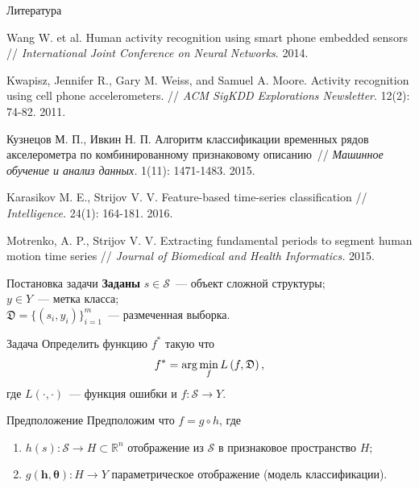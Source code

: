 \documentclass{beamer}
\begin{document}
\begin{frame}{Литература}
	\begin{enumerate}
		{ \footnotesize
		\item Wang W. et al. Human activity recognition using smart phone embedded sensors // \emph{International Joint Conference on Neural Networks}. 2014.
		\vfill
		\item Kwapisz, Jennifer R., Gary M. Weiss, and Samuel A. Moore. Activity recognition using cell phone accelerometers. // \emph{ACM SigKDD Explorations Newsletter}. 12(2): 74-82. 2011.
		\vfill
		\item Кузнецов М. П., Ивкин Н. П. Алгоритм классификации временных рядов акселерометра по комбинированному признаковому описанию~// \emph{Машинное обучение и анализ данных.} 1(11): 1471-1483. 2015.
		\vfill
		\item Karasikov M. E., Strijov V. V. Feature-based time-series classification // \emph{Intelligence.} 24(1): 164-181. 2016.
		\vfill
		\item Motrenko, A. P., Strijov V. V. Extracting fundamental periods to segment human motion time series // \emph{Journal of Biomedical and Health Informatics.} 2015.
		}
	\end{enumerate}
	
\end{frame}
\begin{frame}{Постановка задачи}
	\textbf{Заданы} $s \in \mathcal{S}$~--- объект сложной структуры;\\
	\hspace{43pt}$y \in Y$~--- метка класса;\\
	\hspace{43pt}$\mathfrak{D} = \{(s_i, y_i)\}_{i=1}^m$~--- размеченная выборка. \\
	\vfill
	\begin{block}{Задача}
	 Определить функцию $f^*$ такую что 
	 \vspace{-0.2cm}
	 \[
	 f^* = \arg \min_f L\left(f, \mathfrak{D}\right),\vspace{-0.3cm}
	 \] 
	 где $L(\cdot, \cdot)$~--- функция ошибки и $f: \mathcal{S} \rightarrow Y$.
	\end{block}
	\vfill
	\begin{block}{Предположение}
		Предположим что $f = g \circ h$, где
		\begin{enumerate}
			\item $h(s): \mathcal{S} \rightarrow H \subset \mathbb{R}^n$ отображение из $\mathcal{S}$ в признаковое пространство $H$;
			\item $g(\bm{h}, \bm\theta): H \rightarrow Y$ параметрическое отображение (модель классификации).
		\end{enumerate}
	\end{block}
\end{frame}
\end{document}
